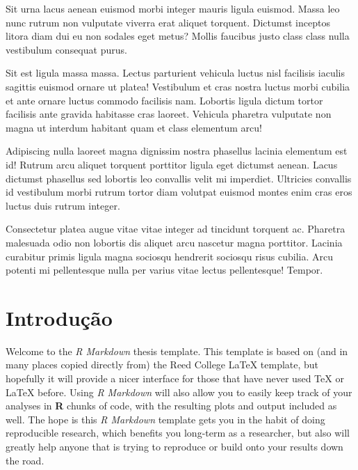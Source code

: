 \documentclass[grad,numbers]{coppe}
\begin{document}
  \begin{foreignabstract}
Sit urna lacus aenean euismod morbi integer mauris ligula euismod. Massa leo nunc rutrum non vulputate viverra erat aliquet torquent. Dictumst inceptos litora diam dui eu non sodales eget metus? Mollis faucibus justo class class nulla vestibulum consequat purus.

Sit est ligula massa massa. Lectus parturient vehicula luctus nisl facilisis iaculis sagittis euismod ornare ut platea! Vestibulum et cras nostra luctus morbi cubilia et ante ornare luctus commodo facilisis nam. Lobortis ligula dictum tortor facilisis ante gravida habitasse cras laoreet. Vehicula pharetra vulputate non magna ut interdum habitant quam et class elementum arcu!

Adipiscing nulla laoreet magna dignissim nostra phasellus lacinia elementum est id! Rutrum arcu aliquet torquent porttitor ligula eget dictumst aenean. Lacus dictumst phasellus sed lobortis leo convallis velit mi imperdiet. Ultricies convallis id vestibulum morbi rutrum tortor diam volutpat euismod montes enim cras eros luctus duis rutrum integer.

Consectetur platea augue vitae vitae integer ad tincidunt torquent ac. Pharetra malesuada odio non lobortis dis aliquet arcu nascetur magna porttitor. Lacinia curabitur primis ligula magna sociosqu hendrerit sociosqu risus cubilia. Arcu potenti mi pellentesque nulla per varius vitae lectus pellentesque! Tempor.
  \end{foreignabstract}
  \tableofcontents

  \listoffigures

  \listoftables

  \printlosymbols
  \printloabbreviations

  \mainmatter

  \hypertarget{introduuxe7uxe3o}{%
  \chapter{Introdução}\label{introduuxe7uxe3o}}
  
  Welcome to the \emph{R Markdown} thesis template. This template is based on (and in many places copied directly from) the Reed College LaTeX template, but hopefully it will provide a nicer interface for those that have never used TeX or LaTeX before. Using \emph{R Markdown} will also allow you to easily keep track of your analyses in \textbf{R} chunks of code, with the resulting plots and output included as well. The hope is this \emph{R Markdown} template gets you in the habit of doing reproducible research, which benefits you long-term as a researcher, but also will greatly help anyone that is trying to reproduce or build onto your results down the road.
  
\end{document}
